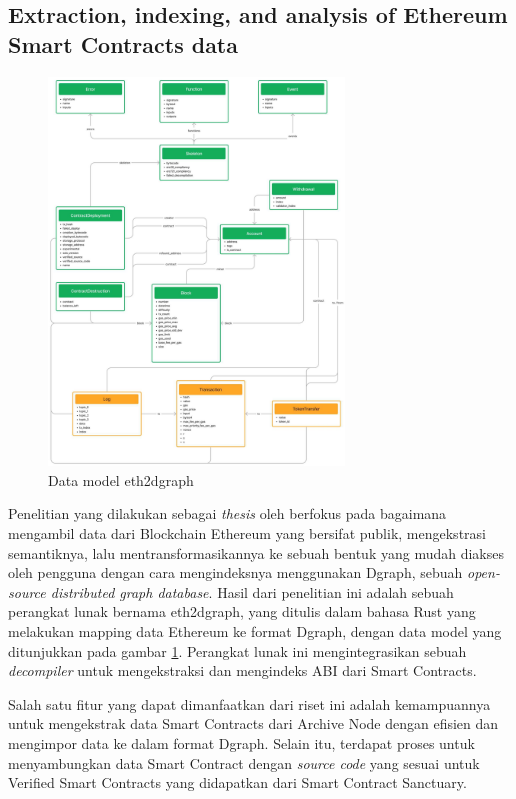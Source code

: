 \subsection{Extraction, indexing, and analysis of Ethereum Smart Contracts data}
\label{subsec:extraction-indexing-analysis-ethereum-sc}

\begin{figure}[ht]
	\centering
	\includegraphics[width=0.7\textwidth]{resources/chapter-2/eth2dgraph-structure.jpg}
	\caption{Data model eth2dgraph \parencite{aimar2023extraction}}
	\label{image:eth2dgraph-structure}
\end{figure}

Penelitian yang dilakukan sebagai \textit{thesis} oleh \cite{aimar2023extraction} berfokus pada bagaimana mengambil data dari Blockchain Ethereum yang bersifat publik, mengekstrasi semantiknya, lalu mentransformasikannya ke sebuah bentuk yang mudah diakses oleh pengguna dengan cara mengindeksnya menggunakan Dgraph, sebuah \textit{open-source distributed graph database}. Hasil dari penelitian ini adalah sebuah perangkat lunak bernama eth2dgraph, yang ditulis dalam bahasa Rust yang melakukan mapping data Ethereum ke format Dgraph, dengan data model yang ditunjukkan pada gambar \ref{image:eth2dgraph-structure}. Perangkat lunak ini mengintegrasikan sebuah \textit{decompiler} untuk mengekstraksi dan mengindeks ABI dari Smart Contracts.

Salah satu fitur yang dapat dimanfaatkan dari riset ini adalah kemampuannya untuk mengekstrak data Smart Contracts dari Archive Node dengan efisien dan mengimpor data ke dalam format Dgraph. Selain itu, terdapat proses untuk menyambungkan data Smart Contract dengan \textit{source code} yang sesuai untuk Verified Smart Contracts yang didapatkan dari Smart Contract Sanctuary. 

